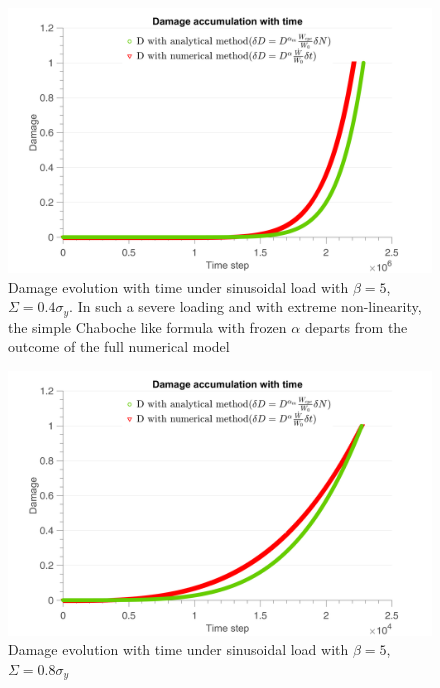 \begin{figure}[!h]
	\centering
	\includegraphics[width=\textwidth]{figures//damsin_bigbeta_04y.png} 
	\caption{Damage evolution with time under sinusoidal load with $\beta=5$, $\Sigma=0.4\sigma_y$. In such a severe loading and with extreme non-linearity, the simple Chaboche like formula with frozen $\alpha$ departs from the outcome of the full numerical model}
	\label{fig.damsin_bigbeta_04y}
\end{figure}
\begin{figure}[!h]
	\centering
	\includegraphics[width=\textwidth]{figures//damsin_bigbeta_08y.png} 
	\caption{Damage evolution with time under sinusoidal load with $\beta=5$, $\Sigma=0.8\sigma_y$}
	\label{fig.damsin_bigbeta_08y}
\end{figure}

\clearpage
